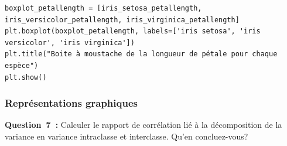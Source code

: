 \begin{lstlisting}[style=myPython, caption=Code Python pour calculer le coefficient de corrélation, frame=lines]
boxplot_petallength = [iris_setosa_petallength, iris_versicolor_petallength, iris_virginica_petallength]
plt.boxplot(boxplot_petallength, labels=['iris setosa', 'iris versicolor', 'iris virginica'])
plt.title("Boite à moustache de la longueur de pétale pour chaque espèce")
plt.show()
\end{lstlisting}

\clearpage

\subsubsection*{Représentations graphiques}
\vspace{.2cm}

\noindent
\textbf{Question~7~:} Calculer le rapport de corrélation lié à la décomposition de la variance en variance intraclasse et interclasse. Qu’en concluez-vous?
\vspace{.2cm}

